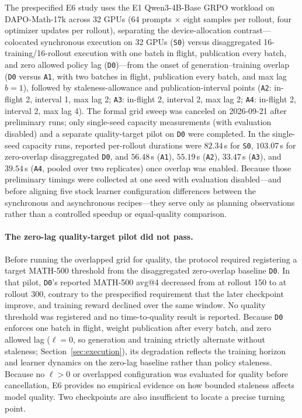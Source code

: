 \documentclass[10pt]{article}
\begin{document}
The prespecified E6 study uses the E1 Qwen3-4B-Base GRPO workload on DAPO-Math-17k across 32 GPUs (64 prompts $\times$ eight samples per rollout, four optimizer updates per rollout), separating the device-allocation contrast---colocated synchronous execution on 32 GPUs (\texttt{S0}) versus disaggregated 16-training/16-rollout execution with one batch in flight, publication every batch, and zero allowed policy lag (\texttt{D0})---from the onset of generation--training overlap (\texttt{D0} versus \texttt{A1}, with two batches in flight, publication every batch, and max lag $b=1$), followed by staleness-allowance and publication-interval points (\texttt{A2}: in-flight 2, interval 1, max lag 2; \texttt{A3}: in-flight 2, interval 2, max lag 2; \texttt{A4}: in-flight 2, interval 2, max lag 4).
The formal grid sweep was canceled on 2026-09-21 after preliminary runs; only single-seed capacity measurements (with evaluation disabled) and a separate quality-target pilot on \texttt{D0} were completed.
In the single-seed capacity runs, reported per-rollout durations were $82.34$\,s for \texttt{S0}, $103.07$\,s for zero-overlap disaggregated \texttt{D0}, and $56.48$\,s (\texttt{A1}), $55.19$\,s (\texttt{A2}), $33.47$\,s (\texttt{A3}), and $39.54$\,s (\texttt{A4}, pooled over two replicates) once overlap was enabled.
Because those preliminary timings were collected at one seed with evaluation disabled---and before aligning five stock learner configuration differences between the synchronous and asynchronous recipes---they serve only as planning observations rather than a controlled speedup or equal-quality comparison.

\paragraph{The zero-lag quality-target pilot did not pass.}
Before running the overlapped grid for quality, the protocol required registering a target MATH-500 threshold from the disaggregated zero-overlap baseline \texttt{D0}.
In that pilot, \texttt{D0}'s reported MATH-500 avg@4 decreased from \ESixQualityEarly{} at rollout 150 to \ESixQualityLate{} at rollout 300, contrary to the prespecified requirement that the later checkpoint improve, and training reward declined over the same window.
No quality threshold was registered and no time-to-quality result is reported.
Because \texttt{D0} enforces one batch in flight, weight publication after every batch, and zero allowed lag ($\ell = 0$, so generation and training strictly alternate without staleness; Section~\ref{sec:execution}), its degradation reflects the training horizon and learner dynamics on the zero-lag baseline rather than policy staleness.
Because no $\ell > 0$ or overlapped configuration was evaluated for quality before cancellation, E6 provides no empirical evidence on how bounded staleness affects model quality.
Two checkpoints are also insufficient to locate a precise turning point.
\end{document}
